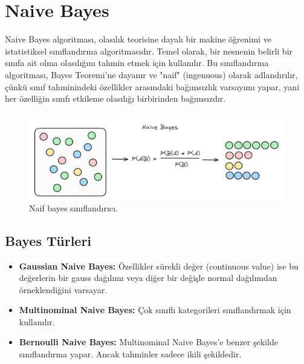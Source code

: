 \section{Naive Bayes}
Naive Bayes algoritması, olasılık teorisine dayalı bir makine öğrenimi ve istatistiksel sınıflandırma algoritmasıdır. Temel olarak, bir nesnenin belirli bir sınıfa ait olma olasılığını tahmin etmek için kullanılır. Bu sınıflandırma algoritması, Bayes Teoremi'ne dayanır ve "naif" (ingenuous) olarak adlandırılır, çünkü sınıf tahminindeki özellikler arasındaki bağımsızlık varsayımı yapar, yani her özelliğin sınıfı etkileme olasılığı birbirinden bağımsızdır.

\begin{figure}[h]
    \centering
    \includegraphics[width=1\textwidth]{images/naive_bayes.png}
    \caption{Naif bayes sınıflandırıcı.}
    \label{fig:enter-label}
\end{figure}

\subsection{Bayes Türleri}
\begin{itemize}
    \item \textbf{Gaussian Naive Bayes:} Özellikler sürekli değer (continuous value) ise bu değerlerin bir gauss dağılımı veya diğer bir değişle normal dağılımdan örneklendiğini varsayar.
    \item \textbf{Multinominal Naive Bayes:} Çok sınıflı kategorileri sınıflandırmak için kullanılır.
    \item \textbf{Bernoulli Naive Bayes:} Multinominal Naive Bayes’e benzer şekilde sınıflandırma yapar. Ancak tahminler sadece ikili şekildedir.
\end{itemize}

\newpage
